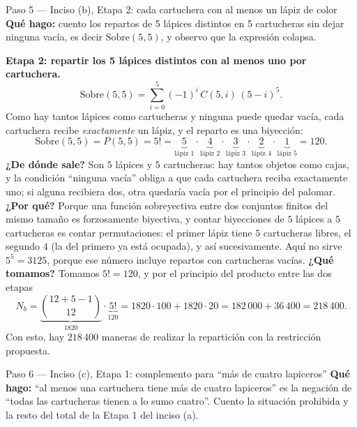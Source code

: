 \documentclass[11pt]{article}
\begin{document}
\begin{sol}
\begin{paso}{Paso 5 --- Inciso (b), Etapa 2: cada cartuchera con al menos un lápiz de color}
\textbf{Qué hago:} cuento los repartos de 5 lápices distintos en 5 cartucheras sin dejar ninguna vacía, es decir $\text{Sobre}(5,5)$, y observo que la expresión colapsa.

\medskip
\textbf{Etapa 2: repartir los 5 lápices distintos con al menos uno por cartuchera.}
\[
\text{Sobre}(5,5)=\sum_{i=0}^{5}(-1)^i\,C(5,i)\,(5-i)^5 .
\]
Como hay tantos lápices como cartucheras y ninguna puede quedar vacía, cada cartuchera recibe \emph{exactamente} un lápiz, y el reparto es una biyección:
\[
\text{Sobre}(5,5)=P(5,5)=5!=\underbrace{5}_{\text{lápiz }1}\cdot\underbrace{4}_{\text{lápiz }2}\cdot\underbrace{3}_{\text{lápiz }3}\cdot\underbrace{2}_{\text{lápiz }4}\cdot\underbrace{1}_{\text{lápiz }5}=120 .
\]
\textbf{¿De dónde sale?} Son $5$ lápices y $5$ cartucheras: hay tantos objetos como cajas, y la condición ``ninguna vacía'' obliga a que cada cartuchera reciba exactamente uno; si alguna recibiera dos, otra quedaría vacía por el principio del palomar.
\textbf{¿Por qué?} Porque una función sobreyectiva entre dos conjuntos finitos del mismo tamaño es forzosamente biyectiva, y contar biyecciones de $5$ lápices a $5$ cartucheras es contar permutaciones: el primer lápiz tiene $5$ cartucheras libres, el segundo $4$ (la del primero ya está ocupada), y así sucesivamente. Aquí no sirve $5^5=3125$, porque ese número incluye repartos con cartucheras vacías.
\textbf{¿Qué tomamos?} Tomamos $5!=120$, y por el principio del producto entre las dos etapas
\[
N_b=\underbrace{\binom{12+5-1}{12}}_{1820}\cdot\underbrace{5!}_{120}=1820\cdot 100+1820\cdot 20=182\,000+36\,400=218\,400 .
\]
Con esto, hay $218\,400$ maneras de realizar la repartición con la restricción propuesta.
\end{paso}

\begin{paso}{Paso 6 --- Inciso (c), Etapa 1: complemento para ``más de cuatro lapiceros''}
\textbf{Qué hago:} ``al menos una cartuchera tiene más de cuatro lapiceros'' es la negación de ``todas las cartucheras tienen a lo sumo cuatro''. Cuento la situación prohibida y la resto del total de la Etapa 1 del inciso (a).


\end{paso}
\end{sol}
\end{document}
